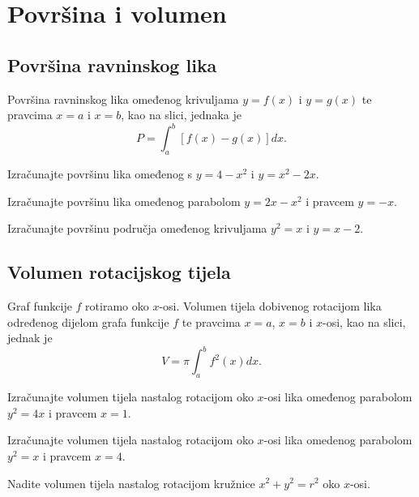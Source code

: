 \section{Površina i volumen}

\subsection{Površina ravninskog lika}

Površina ravninskog lika omeđenog krivuljama $y=f(x)$ i $y=g(x)$ te pravcima
$x=a$ i $x=b$, kao na slici, jednaka je
$$
    P=\int_a^b [f(x) - g(x)] dx.
$$

\begin{example}
    Izračunajte površinu lika omeđenog s $y=4-x^2$ i $y=x^2-2x$.
\end{example}

\begin{example}
    Izračunajte površinu lika omeđenog parabolom $y=2x-x^2$ i pravcem $y=-x$.
\end{example}


\begin{example}
    Izračunajte površinu područja omeđenog krivuljama $y^2=x$ i $y=x-2$.
\end{example}

\subsection{Volumen rotacijskog tijela}

Graf funkcije $f$ rotiramo oko $x$-osi. Volumen tijela dobivenog rotacijom lika
određenog dijelom grafa funkcije $f$ te pravcima $x=a$, $x=b$ i $x$-osi, kao na
slici, jednak je
$$
    V=\pi \int_a^b f^2(x)dx.
$$

\begin{example}
    Izračunajte volumen tijela nastalog rotacijom oko $x$-osi lika omeđenog
    parabolom $y^2=4x$ i pravcem $x=1$.
\end{example}

\begin{example}
    Izračunajte volumen tijela nastalog rotacijom oko $x$-osi lika omedenog
    parabolom $y^2 = x$ i pravcem $x=4$.
\end{example}

\begin{example}
    Nadite volumen tijela nastalog rotacijom kružnice $x^2+y^2=r^2$ oko $x$-osi.
\end{example}

